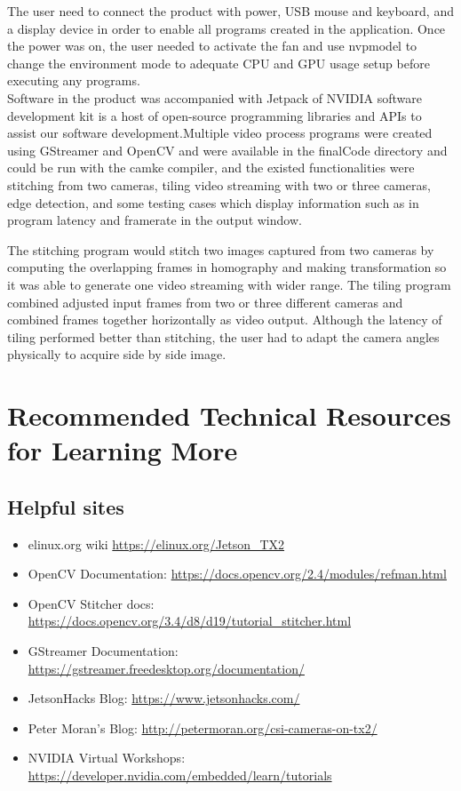 \documentclass[letterpaper,10pt,serif,draftclsnofoot,onecolumn,compsoc,titlepage]{IEEEtran}
\begin{document}
The user need to connect the product with power, USB mouse and keyboard, and a display device in 
order to enable all programs created in the application. Once the power was on, the user needed 
to activate the fan and use nvpmodel to change the environment mode to adequate CPU and GPU usage 
setup before executing any programs. \\

Software in the product was accompanied with Jetpack of NVIDIA software development kit is a host 
of open-source programming libraries and APIs to assist our software development.Multiple video 
process programs were created using GStreamer and OpenCV and were available in the finalCode 
directory and could be run with the camke compiler, and the existed functionalities were stitching 
from two cameras, tiling video streaming with two or three cameras, edge detection, and some 
testing cases which display information such as in program latency and framerate in the output 
window. \\

\newpage

The stitching program would stitch two images captured from two cameras by computing the overlapping 
frames in homography and making transformation so it was able to generate one video streaming with 
wider range. The tiling program combined adjusted input frames from two or three different cameras 
and combined frames together horizontally as video output. Although the latency of tiling performed 
better than stitching, the user had to adapt the camera angles physically to acquire side by side 
image. \\

\newpage

\section{Recommended Technical Resources for Learning More}
\subsection{Helpful sites}
\begin{itemize}
\item elinux.org wiki \url{https://elinux.org/Jetson_TX2}
\item OpenCV Documentation: \url{https://docs.opencv.org/2.4/modules/refman.html}
\item OpenCV Stitcher docs: \url{https://docs.opencv.org/3.4/d8/d19/tutorial_stitcher.html}
\item GStreamer Documentation: \url{https://gstreamer.freedesktop.org/documentation/}
\item JetsonHacks Blog: \url{https://www.jetsonhacks.com/}
\item Peter Moran's Blog: \url{http://petermoran.org/csi-cameras-on-tx2/}
\item NVIDIA Virtual Workshops: \url{https://developer.nvidia.com/embedded/learn/tutorials}
\end{itemize}
\end{document}
